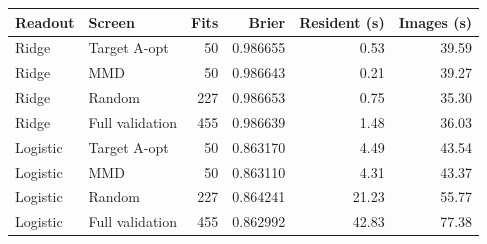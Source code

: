 \begin{tabular}{llrrrr}
\toprule
Readout & Screen & Fits & Brier & Resident (s) & Images (s)\\
\midrule
Ridge & Target A-opt & 50 & 0.986655 & 0.53 & 39.59 \\
Ridge & MMD & 50 & 0.986643 & 0.21 & 39.27 \\
Ridge & Random & 227 & 0.986653 & 0.75 & 35.30 \\
Ridge & Full validation & 455 & 0.986639 & 1.48 & 36.03 \\
Logistic & Target A-opt & 50 & 0.863170 & 4.49 & 43.54 \\
Logistic & MMD & 50 & 0.863110 & 4.31 & 43.37 \\
Logistic & Random & 227 & 0.864241 & 21.23 & 55.77 \\
Logistic & Full validation & 455 & 0.862992 & 42.83 & 77.38 \\
\bottomrule
\end{tabular}
